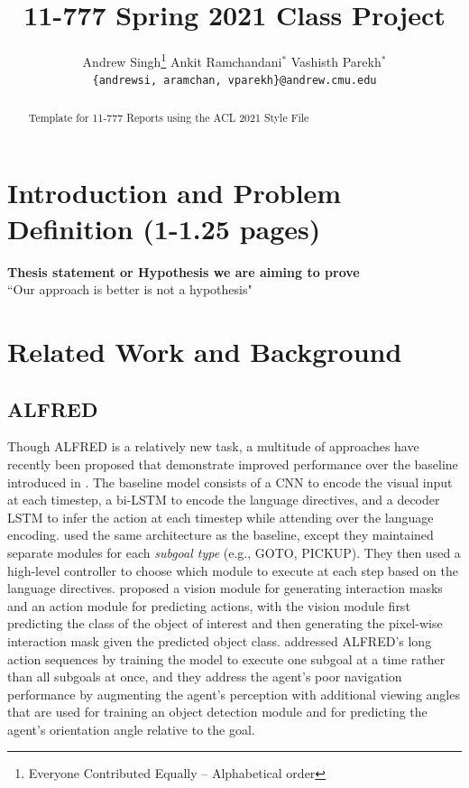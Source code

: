 \documentclass[11pt,a4paper]{article}
\title{11-777 Spring 2021 Class Project}
\author{
  Andrew Singh\thanks{\hspace{4pt}Everyone Contributed Equally -- Alphabetical order} \hspace{2em} Ankit Ramchandani$^*$ \hspace{2em} Vashisth Parekh$^*$ \\
  \texttt{\{andrewsi, aramchan, vparekh\}@andrew.cmu.edu}
  }
\date{}
\begin{document}
\maketitle
\begin{abstract}
Template for 11-777 Reports using the ACL 2021 Style File 
\end{abstract}

\section{Introduction and Problem Definition (1-1.25 pages)}
\textbf{Thesis statement or Hypothesis we are aiming to prove}\\
``Our approach is better is not a hypothesis"

\clearpage
\section{Related Work and Background}
\subsection{ALFRED}
\label{ssec:alf}
Though ALFRED is a relatively new task, a multitude of approaches have recently been proposed that demonstrate improved performance over the baseline introduced in \cite{shridhar2020alfred}. The baseline model consists of a CNN to encode the visual input at each timestep, a bi-LSTM to encode the language directives, and a decoder LSTM to infer the action at each timestep while attending over the language encoding. \cite{corona2020modularity} used the same architecture as the baseline, except they maintained separate modules for each \emph{subgoal type} (e.g., GOTO, PICKUP). They then used a high-level controller to choose which module to execute at each step based on the language directives. \cite{singh2020moca} proposed a vision module for generating interaction masks and an action module for predicting actions, with the vision module first predicting the class of the object of interest and then generating the pixel-wise interaction mask given the predicted object class. \cite{Storks2021AreWT} addressed ALFRED's long action sequences by training the model to execute one subgoal at a time rather than all subgoals at once, and they address the agent's poor navigation performance by augmenting the agent's perception with additional viewing angles that are used for training an object detection module and for predicting the agent's orientation angle relative to the goal.
\end{document}
